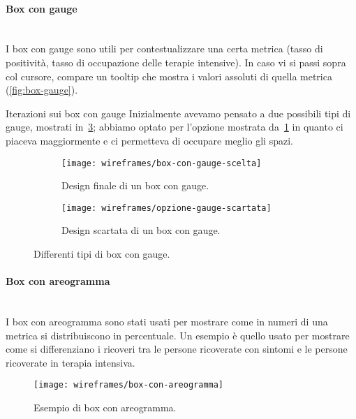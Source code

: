\documentclass[../../../main.tex]{subfiles}
\begin{document}
\paragraph{Box con gauge}\mbox{}\\
I box con gauge sono utili per contestualizzare una certa metrica (tasso di positività, tasso di occupazione delle terapie intensive). In caso vi si passi sopra col cursore, compare un tooltip che mostra i valori assoluti di quella metrica (\ref{fig:box-gauge}).

\begin{bclogo}{Iterazioni sui box con gauge}
    Inizialmente avevamo pensato a due possibili tipi di gauge, mostrati in~\ref{fig:opzioni-gauge}; abbiamo optato per l'opzione mostrata da~\ref{fig:opzione-gauge-finale} in quanto ci piaceva maggiormente e ci permetteva di occupare meglio gli spazi.

    \begin{figure}[H]
    \begin{subfigure}[b]{0.5\textwidth}
        \centering
        \texttt{[image: wireframes/box-con-gauge-scelta]}
        \caption{Design finale di un box con gauge.}
        \label{fig:opzione-gauge-finale}
    \end{subfigure}
\hfill
    \begin{subfigure}[b]{0.5\textwidth}
        \centering
        \texttt{[image: wireframes/opzione-gauge-scartata]}
        \caption{Design scartata di un box con gauge.}
        \label{fig:opzione-gauge-scartata}
    \end{subfigure}
    \caption{Differenti tipi di box con gauge.}
    \label{fig:opzioni-gauge}
\end{figure}

\end{bclogo}

\clearpage
\paragraph{Box con areogramma}\mbox{}\\
I box con areogramma sono stati usati per mostrare come in numeri di una metrica si distribuiscono in percentuale. Un esempio è quello usato per mostrare come si differenziano i ricoveri tra le persone ricoverate con sintomi e le persone ricoverate in terapia intensiva.
\begin{figure}[H]
    \centering
    \texttt{[image: wireframes/box-con-areogramma]}
    \caption{Esempio di box con areogramma.}\label{fig:box-areogramma}
\end{figure}
\end{document}
